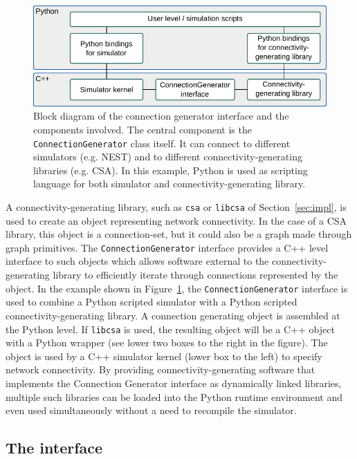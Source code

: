 \documentclass{frontiersSCNS} %
\newcommand{\INLINEFIGS}{} %
\newcommand{\Figure}[2]{Figure~\ref{#2}}
\newcommand{\Figure}[2]{Figure~#1}
\begin{document}
\ifdefined\INLINEFIGS
\begin{figure}[ht]
\centering
\includegraphics[scale=.8]{figures/block_diagram_conngen.pdf}
\caption{Block diagram of the connection generator interface and the
  components involved. The central component is the
  \texttt{ConnectionGenerator} class itself. It can connect to different
  simulators (e.g. NEST) and to different connectivity-generating
  libraries (e.g. CSA). In this example, Python is used as scripting
  language for both simulator and connectivity-generating
  library.}\label{fig:block_diagram_conngen}
\end{figure}
\fi

A connectivity-generating library, such as
\verb|csa| or \verb|libcsa| of Section~\ref{sec:impl}, is used to
create an object representing network connectivity.  In the case of a
CSA library, this object is a connection-set, but it could also be a
graph made through graph primitives. The \verb|ConnectionGenerator| interface
provides a C++ level interface to such objects which allows software
external to the connectivity-generating library to efficiently iterate
through connections represented by the object.  In the example shown
in \Figure{2}{fig:block_diagram_conngen}, the \verb|ConnectionGenerator|
interface is used to combine a Python scripted simulator with a Python
scripted connectivity-generating library. A connection generating object
is assembled at the Python level.  If \verb|libcsa| is used, the
resulting object will be a C++ object with a Python wrapper (see
lower two boxes to the right in the figure). The object is used by a
C++ simulator kernel (lower box to the left) to specify network
connectivity. By providing connectivity-generating software that implements the
Connection Generator interface as dynamically linked libraries, multiple
such libraries can be loaded into the Python runtime environment and
even used simultaneously without a need to recompile the simulator.

\subsection{The interface}\label{sec:cgint}
\end{document}
